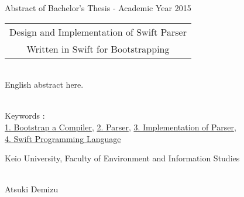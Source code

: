 Abstract of Bachelor's Thesis - Academic Year 2015
~ \\


\begin{center}
\begin{Large}
\begin{tabular}{|c|} \hline
Design and Implementation of Swift Parser\\
Written in Swift for Bootstrapping
\\
\hline
\end{tabular}
\end{Large}
\end{center}
~  \\

English abstract here.

~ \\
Keywords : \\
\underline{1. Bootstrap a Compiler},
\underline{2. Parser},
\underline{3. Implementation of Parser},\\
\underline{4. Swift Programming Language}

\begin{flushright}
Keio University, Faculty of Environment and Information Studies\\
~ \\
\begin{Large}
Atsuki Demizu
\end{Large}
\end{flushright}
